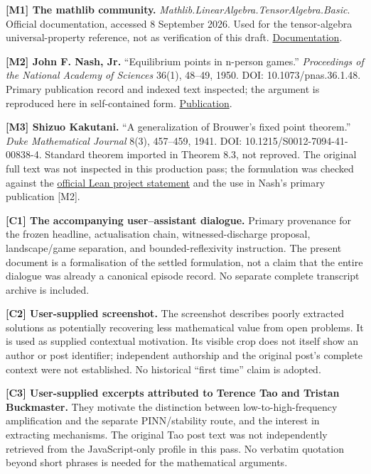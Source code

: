 \documentclass[11pt,a4paper]{article}
\begin{document}
\textbf{{[}M1{]} The mathlib community.}
\emph{Mathlib.LinearAlgebra.TensorAlgebra.Basic}. Official
documentation, accessed 8 September 2026. Used for the tensor-algebra
universal-property reference, not as verification of this draft.
\href{https://leanprover-community.github.io/mathlib4_docs/Mathlib/LinearAlgebra/TensorAlgebra/Basic.html}{Documentation}.

\textbf{{[}M2{]} John F. Nash, Jr.} ``Equilibrium points in n-person
games.'' \emph{Proceedings of the National Academy of Sciences} 36(1),
48--49, 1950. DOI: 10.1073/pnas.36.1.48. Primary publication record and
indexed text inspected; the argument is reproduced here in
self-contained form.
\href{https://doi.org/10.1073/pnas.36.1.48}{Publication}.

\textbf{{[}M3{]} Shizuo Kakutani.} ``A generalization of Brouwer's fixed
point theorem.'' \emph{Duke Mathematical Journal} 8(3), 457--459, 1941.
DOI: 10.1215/S0012-7094-41-00838-4. Standard theorem imported in Theorem
8.3, not reproved. The original full text was not inspected in this
production pass; the formulation was checked against the
\href{https://lean-lang.org/eval/problems/kakutani_fixed_point/}{official
Lean project statement} and the use in Nash's primary publication
{[}M2{]}.

\textbf{{[}C1{]} The accompanying user--assistant dialogue.} Primary
provenance for the frozen headline, actualisation chain,
witnessed-discharge proposal, landscape/game separation, and
bounded-reflexivity instruction. The present document is a formalisation
of the settled formulation, not a claim that the entire dialogue was
already a canonical episode record. No separate complete transcript
archive is included.

\textbf{{[}C2{]} User-supplied screenshot.} The screenshot describes
poorly extracted solutions as potentially recovering less mathematical
value from open problems. It is used as supplied contextual motivation.
Its visible crop does not itself show an author or post identifier;
independent authorship and the original post's complete context were not
established. No historical ``first time'' claim is adopted.

\textbf{{[}C3{]} User-supplied excerpts attributed to Terence Tao and
Tristan Buckmaster.} They motivate the distinction between
low-to-high-frequency amplification and the separate PINN/stability
route, and the interest in extracting mechanisms. The original Tao post
text was not independently retrieved from the JavaScript-only profile in
this pass. No verbatim quotation beyond short phrases is needed for the
mathematical arguments.
\end{document}
